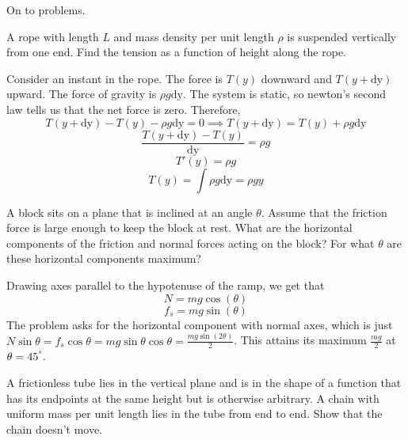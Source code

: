 \documentclass[11pt]{scrartcl}
\newcommand{\ca}[1]{\mathrm{#1}}
\begin{document}
On to problems.
\begin{example}
  A rope with length $L$ and mass density per unit length $\rho$ is suspended
  vertically from one end. Find the tension as a function of height along the rope.
\end{example}
\begin{soln}
  Consider an instant in the rope. The force is $T(y)$ downward and
  $T(y+\ca{dy})$ upward. The force of gravity is $\rho g\ca{dy}$. The system is static,
  so newton's second law tells us that the net force is zero. Therefore,
  $$T(y+\ca{dy})-T(y)-\rho g\ca{dy}=0 \implies T(y+\ca{dy})=T(y)+\rho g\ca{dy}$$
  $$\frac{T(y+\ca{dy})-T(y)}{\ca{dy}}=\rho g$$
  $$T'(y)=\rho g$$
  $$T(y)=\int \rho g \ca{dy}=\rho g y$$
\end{soln}
\begin{example}
  A block sits on a plane that is inclined at an angle $\theta$.
  Assume that the friction force is large enough to keep the block at rest.
  What are the horizontal components of the friction and normal forces
  acting on the block? For what $\theta$ are these horizontal components
  maximum?
\end{example}
\begin{soln}
  Drawing axes parallel to the hypotenuse of the ramp, we get that
  $$N=mg\cos(\theta)$$
  $$f_s=mg\sin(\theta)$$
  The problem asks for the horizontal component with normal axes, which is
  just $N\sin\theta=f_s\cos\theta=mg\sin\theta\cos\theta=\frac{mg\sin(2\theta)}{2}$.
  This attains its maximum $\frac{mg}{2}$ at $\theta=45^{\degree}$.
\end{soln}
\newpage
\begin{example}
  A frictionless tube lies in the vertical plane and is in the shape
  of a function that has its endpoints at the same height but is otherwise
  arbitrary. A chain with uniform mass per unit length lies in the tube from
  end to end. Show that the chain doesn't move.
\end{example}
\end{document}
